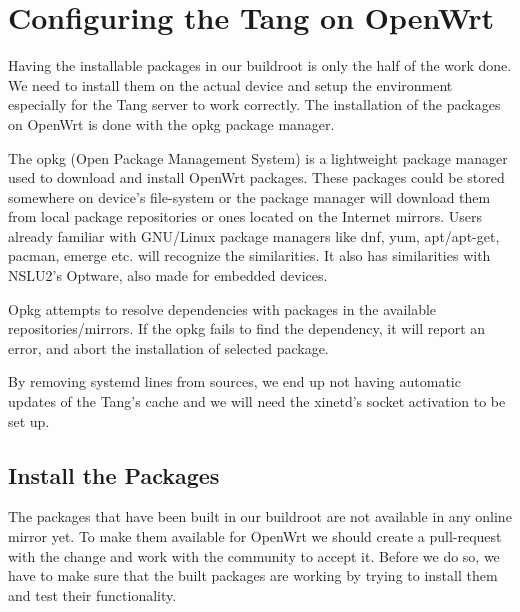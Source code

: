 \chapter{Configuring the Tang on OpenWrt}\label{config}

Having the installable packages in our buildroot is only the half of the work done.
We need to install them on the actual device and setup the environment especially for the Tang server to work correctly.
The installation of the packages on OpenWrt is done with the opkg package manager.

The opkg (Open Package Management System) is a lightweight package manager used to download and install OpenWrt packages.
These packages could be stored somewhere on device's file-system or the package manager will download them from local package repositories or ones located on the Internet mirrors.
Users already familiar with GNU/Linux package managers like dnf, yum, apt/apt-get, pacman, emerge etc. will recognize the similarities.
It also has similarities with NSLU2's Optware, also made for embedded devices.

Opkg attempts to resolve dependencies with packages in the available repositories/mirrors.
If the opkg fails to find the dependency, it will report an error, and abort the installation of selected package.

By removing systemd lines from sources, we end up not having automatic updates of the Tang's cache and we will need the xinetd's socket activation to be set up.



\section{Install the Packages}

The packages that have been built in our buildroot are not available in any online mirror yet.
To make them available for OpenWrt we should create a pull-request with the change and work with the community to accept it.
Before we do so, we have to make sure that the built packages are working by trying to install them and test their functionality.

